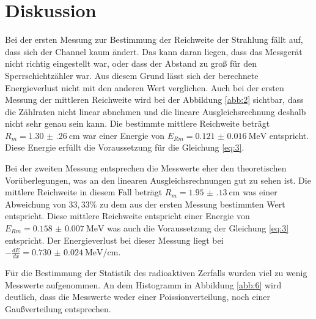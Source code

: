 \section{Diskussion}

Bei der ersten Messung zur Bestimmung der Reichweite der Strahlung fällt auf, dass
sich der Channel kaum ändert. Das kann daran liegen, dass das Messgerät nicht
richtig eingestellt war, oder dass der Abstand zu groß für den Sperrschichtzähler
war. Aus diesem Grund lässt sich der berechnete Energieverlust nicht mit den anderen Wert
verglichen.
Auch bei der ersten Messung der mittleren Reichweite wird bei der Abbildung \ref{abb:2}
sichtbar, dass die Zählraten nicht linear abnehmen und die lineare Ausgleichsrechnung
deshalb nicht sehr genau sein kann. Die bestimmte mittlere Reichweite beträgt
$R_m = \SI{1.30(26)}{\centi\meter}$ war einer Energie von $E_{Rm} = \SI{0.121(16)}{\mega\eV}$
entspricht. Diese Energie erfüllt die Voraussetzung für die Gleichung \ref{eq:3}.

Bei der zweiten Messung entsprechen die Messwerte eher den theoretischen Vorüberlegungen,
was an den linearen Ausgleichsrechnungen gut zu sehen ist. Die mittlere Reichweite
in diesem Fall beträgt $R_m = \SI{1.95(13)}{\centi\meter}$ was einer Abweichung
von $33,33 \%$ zu dem aus der ersten Messung bestimmten Wert entspricht.
Diese mittlere Reichweite entspricht einer Energie von $E_{Rm} = \SI{0.158(7)}{\mega\eV}$
was auch die Voraussetzung der Gleichung \ref{eq:3} entspricht.
Der Energieverlust bei dieser Messung liegt bei $-\frac{dE}{dx} = \SI{0.730(24)}{\mega\eV\per\centi\meter}$.

Für die Bestimmung der Statistik des radioaktiven Zerfalls wurden viel zu wenig
Messwerte aufgenommen. An dem Histogramm in Abbildung \ref{abb:6} wird deutlich,
dass die Messwerte weder einer Poissionverteilung, noch einer Gaußverteilung
entsprechen.

